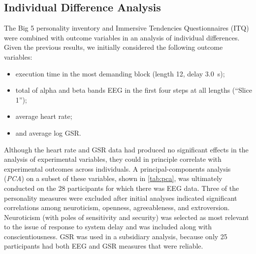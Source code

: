 \subsection{Individual Difference Analysis}

The Big 5 personality inventory and Immersive Tendencies Questionnaires (ITQ) were combined with outcome variables in an analysis of individual differences.
Given the previous results, we initially considered the following outcome variables:
\begin{itemize}
    \item execution time in the most demanding block (length 12, delay \SI{3.0}{\second}); 
    \item total of alpha and beta bands EEG in the first four steps at all lengths (``Slice 1'');
    \item average heart rate;
    \item and average log GSR.\@
\end{itemize}

Although the heart rate and GSR data had produced no significant effects in the analysis of experimental variables, they could in principle correlate with experimental outcomes across individuals. 
A principal-components analysis (\emph{PCA}) on a subset of these variables, shown in \cref{tab:pca}, was ultimately conducted on the 28 participants for which there was EEG data. 
Three of the personality measures were excluded after initial analyses indicated significant correlations among neuroticism, openness, agreeableness, and extroversion.
Neuroticism (with poles of sensitivity and security) was selected as most relevant to the issue of response to system delay and was included along with conscientiousness.
GSR was used in a subsidiary analysis, because only 25 participants had both EEG and GSR measures that were reliable.

